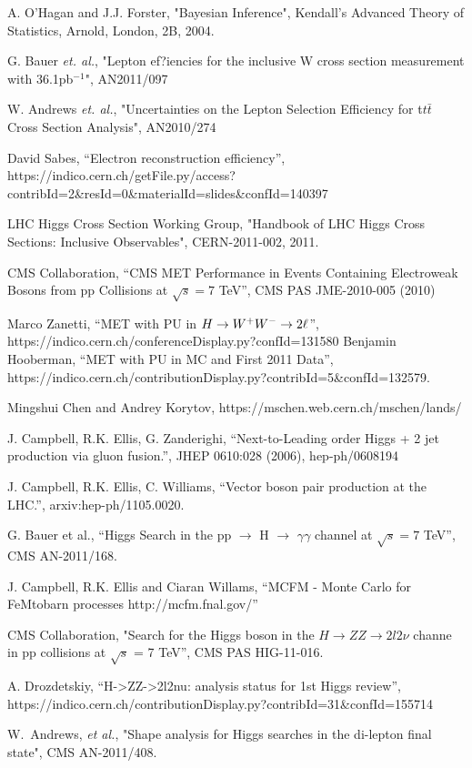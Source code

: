 A. O'Hagan and J.J. Forster, "Bayesian Inference", Kendall's Advanced Theory of Statistics, 
Arnold, London, 2B, 2004.

G. Bauer {\it et. al.}, "Lepton ef?iencies for the inclusive W cross section measurement with 36.1pb$^{-1}$", AN2011/097

W. Andrews {\it et. al.}, "Uncertainties on the Lepton Selection Efficiency for t$t\bar{t}$ Cross Section Analysis", AN2010/274

David Sabes, ``Electron reconstruction efficiency'', https://indico.cern.ch/getFile.py/access?contribId=2\&resId=0\&materialId=slides\&confId=140397

LHC Higgs Cross Section Working Group, "Handbook of LHC Higgs Cross Sections: 
Inclusive Observables", CERN-2011-002, 2011.

CMS Collaboration, ``CMS MET Performance in Events Containing Electroweak Bosons from pp Collisions at $\sqrt{s}=7$ TeV'', CMS PAS JME-2010-005 (2010)


Marco Zanetti, ``MET with PU in $H\to W^+W^-\to2\ell$'', https://indico.cern.ch/conferenceDisplay.py?confId=131580
Benjamin Hooberman, ``MET with PU in MC and First 2011 Data'', https://indico.cern.ch/contributionDisplay.py?contribId=5\&confId=132579. 


Mingshui Chen and Andrey Korytov, https://mschen.web.cern.ch/mschen/lands/

J. Campbell, R.K. Ellis, G. Zanderighi, ``Next-to-Leading order Higgs + 2 jet production via gluon fusion.'', JHEP 0610:028 (2006), hep-ph/0608194

J. Campbell, R.K. Ellis, C. Williams, ``Vector boson pair production at the LHC.'', arxiv:hep-ph/1105.0020.

G. Bauer et al., ``Higgs Search in the pp $\rightarrow$ H $\rightarrow$ $\gamma\gamma$ channel at $\sqrt{s}=7$ TeV'', CMS AN-2011/168. 

J. Campbell, R.K. Ellis and Ciaran Willams, ``MCFM - Monte Carlo for FeMtobarn processes http://mcfm.fnal.gov/''

CMS Collaboration, "Search for the Higgs boson in the $H\to ZZ\to 2l2\nu$ 
channe in pp collisions at $\sqrt{s}$ = 7 TeV'', CMS PAS HIG-11-016.

A. Drozdetskiy, ``H->ZZ->2l2nu: analysis status for 1st Higgs review'', https://indico.cern.ch/contributionDisplay.py?contribId=31\&confId=155714


W.~Andrews, \textit{et al.}, "Shape analysis for Higgs searches in the di-lepton final state", CMS AN-2011/408.